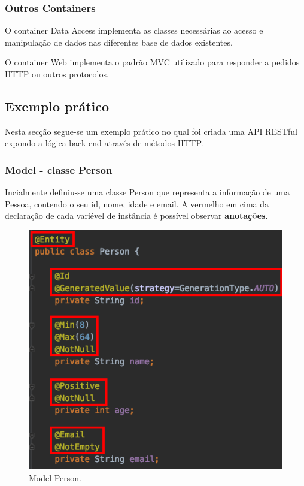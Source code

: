 \subsubsection{Outros Containers}

\hspace{5mm} O container Data Access implementa as classes necessárias ao acesso e manipulação de dados nas diferentes base de dados existentes.

\hspace{5mm} O container Web implementa o padrão MVC utilizado para responder a pedidos HTTP ou outros protocolos.


\subsection{Exemplo prático}

\hspace{5mm} Nesta secção segue-se um exemplo prático no qual foi criada uma API RESTful expondo a lógica back end através de métodos HTTP.

\subsubsection{Model - classe Person}

\hspace{5mm} Incialmente definiu-se uma classe Person que representa a informação de uma Pessoa, contendo o seu id, nome, idade e email. A vermelho em cima da declaração de cada variével de instância é possível observar \textbf{anotações}. 

\begin{figure}[H]
    \centering
    \includegraphics[scale=0.6]{images/Person_variables.png}
    \caption{Model Person.}
    \label{fig:grails}
\end{figure}


